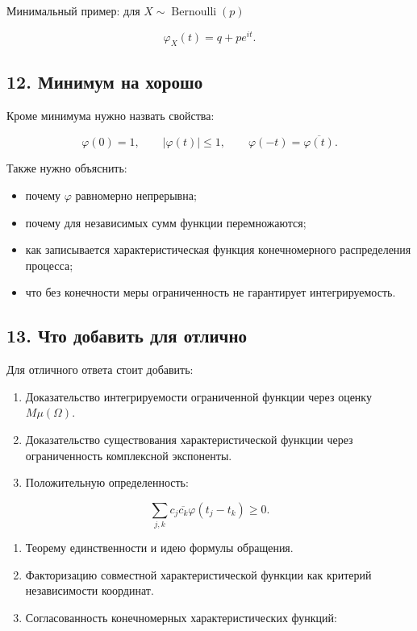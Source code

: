 \documentclass[
  11pt,
  a4paper,
]{article}
\providecommand{\tightlist}{%
  \setlength{\itemsep}{0pt}\setlength{\parskip}{0pt}}
\begin{document}
Минимальный пример: для \(X\sim \operatorname{Bernoulli}(p)\)

\[
\varphi_X(t)=q+pe^{it}.
\]

\subsection{12. Минимум на
хорошо}\label{ux43cux438ux43dux438ux43cux443ux43c-ux43dux430-ux445ux43eux440ux43eux448ux43e}

Кроме минимума нужно назвать свойства:

\[
\varphi(0)=1,\qquad |\varphi(t)|\le1,\qquad
\varphi(-t)=\overline{\varphi(t)}.
\]

Также нужно объяснить:

\begin{itemize}
\tightlist
\item
  почему \(\varphi\) равномерно непрерывна;
\item
  почему для независимых сумм функции перемножаются;
\item
  как записывается характеристическая функция конечномерного
  распределения процесса;
\item
  что без конечности меры ограниченность не гарантирует интегрируемость.
\end{itemize}

\subsection{13. Что добавить для
отлично}\label{ux447ux442ux43e-ux434ux43eux431ux430ux432ux438ux442ux44c-ux434ux43bux44f-ux43eux442ux43bux438ux447ux43dux43e}

Для отличного ответа стоит добавить:

\begin{enumerate}
\def\labelenumi{\arabic{enumi}.}
\item
  Доказательство интегрируемости ограниченной функции через оценку
  \(M\mu(\Omega)\).
\item
  Доказательство существования характеристической функции через
  ограниченность комплексной экспоненты.
\item
  Положительную определенность:
\end{enumerate}

\[
\sum_{j,k} c_j\overline{c_k}\varphi(t_j-t_k)\ge0.
\]

\begin{enumerate}
\def\labelenumi{\arabic{enumi}.}
\setcounter{enumi}{3}
\item
  Теорему единственности и идею формулы обращения.
\item
  Факторизацию совместной характеристической функции как критерий
  независимости координат.
\item
  Согласованность конечномерных характеристических функций:
\end{enumerate}
\end{document}
